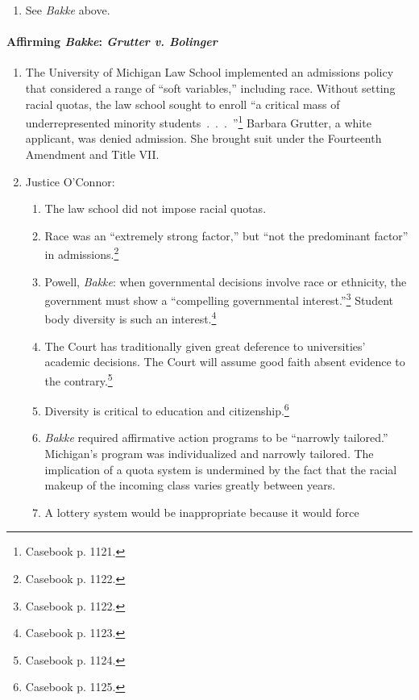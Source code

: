 \begin{enumerate}
    \item See \emph{Bakke} above.
\end{enumerate}

\paragraph{Affirming \emph{Bakke}: \emph{Grutter v. Bolinger}}

\begin{enumerate}
    \item The University of Michigan Law School implemented an admissions 
    policy that considered a range of ``soft variables,'' including race. 
    Without setting racial quotas, the law school sought to enroll ``a 
    critical mass of underrepresented minority 
    students~.~.~.~''\footnote{Casebook p. 1121.} Barbara Grutter, a white 
    applicant, was denied admission. She brought suit under the Fourteenth 
    Amendment and Title VII.
    \item Justice O'Connor:
    \begin{enumerate}
        \item The law school did not impose racial quotas.
        \item Race was an ``extremely strong factor,'' but ``not the 
        predominant factor'' in admissions.\footnote{Casebook p. 1122.}
        \item Powell, \emph{Bakke}: when governmental decisions involve race 
        or ethnicity, the government must show a ``compelling governmental 
        interest.''\footnote{Casebook p. 1122.} Student body diversity is such 
        an interest.\footnote{Casebook p. 1123.}
        \item The Court has traditionally given great deference to 
        universities' academic decisions. The Court will assume good faith 
        absent evidence to the contrary.\footnote{Casebook p. 1124.}
        \item Diversity is critical to education and 
        citizenship.\footnote{Casebook p. 1125.}
        \item \emph{Bakke} required affirmative action programs to be 
        ``narrowly tailored.'' Michigan's program was individualized and 
        narrowly tailored. The implication of a quota system is undermined by 
        the fact that the racial makeup of the incoming class varies greatly 
        between years.
        \item A lottery system would be inappropriate because it would force 

\end{enumerate}
\end{enumerate}
